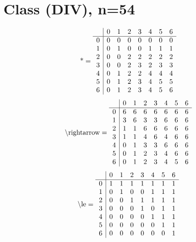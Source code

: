 \documentclass[11pt]{article}
\begin{document}
\section{Class (DIV), n=54}
\[\text{*} = 
\begin{array}{r | r r r r r r r}
 & 0 & 1 & 2 & 3 & 4 & 5 & 6 \\ \hline
0 & 0 & 0 & 0 & 0 & 0 & 0 & 0 \\
1 & 0 & 1 & 0 & 0 & 1 & 1 & 1 \\
2 & 0 & 0 & 2 & 2 & 2 & 2 & 2 \\
3 & 0 & 0 & 2 & 3 & 2 & 3 & 3 \\
4 & 0 & 1 & 2 & 2 & 4 & 4 & 4 \\
5 & 0 & 1 & 2 & 3 & 4 & 5 & 5 \\
6 & 0 & 1 & 2 & 3 & 4 & 5 & 6 \\
\end{array}
\]
\[\text{\textbackslash rightarrow} = 
\begin{array}{r | r r r r r r r}
 & 0 & 1 & 2 & 3 & 4 & 5 & 6 \\ \hline
0 & 6 & 6 & 6 & 6 & 6 & 6 & 6 \\
1 & 3 & 6 & 3 & 3 & 6 & 6 & 6 \\
2 & 1 & 1 & 6 & 6 & 6 & 6 & 6 \\
3 & 1 & 1 & 4 & 6 & 4 & 6 & 6 \\
4 & 0 & 1 & 3 & 3 & 6 & 6 & 6 \\
5 & 0 & 1 & 2 & 3 & 4 & 6 & 6 \\
6 & 0 & 1 & 2 & 3 & 4 & 5 & 6 \\
\end{array}
\]
\[\text{\textbackslash le} = 
\begin{array}{r | r r r r r r r}
 & 0 & 1 & 2 & 3 & 4 & 5 & 6 \\ \hline
0 & 1 & 1 & 1 & 1 & 1 & 1 & 1 \\
1 & 0 & 1 & 0 & 0 & 1 & 1 & 1 \\
2 & 0 & 0 & 1 & 1 & 1 & 1 & 1 \\
3 & 0 & 0 & 0 & 1 & 0 & 1 & 1 \\
4 & 0 & 0 & 0 & 0 & 1 & 1 & 1 \\
5 & 0 & 0 & 0 & 0 & 0 & 1 & 1 \\
6 & 0 & 0 & 0 & 0 & 0 & 0 & 1 \\
\end{array}
\]
\end{document}
